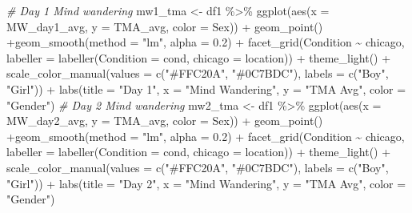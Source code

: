 \documentclass[
  letterpaper,
  DIV=11,
  numbers=noendperiod]{scrartcl}
\newenvironment{Shaded}{\begin{snugshade}}{\end{snugshade}}
\newcommand{\AttributeTok}[1]{\textcolor[rgb]{0.49,0.56,0.16}{#1}}
\newcommand{\CommentTok}[1]{\textcolor[rgb]{0.38,0.63,0.69}{\textit{#1}}}
\newcommand{\FloatTok}[1]{\textcolor[rgb]{0.25,0.63,0.44}{#1}}
\newcommand{\FunctionTok}[1]{\textcolor[rgb]{0.02,0.16,0.49}{#1}}
\newcommand{\NormalTok}[1]{\textcolor[rgb]{0.00,0.44,0.13}{#1}}
\newcommand{\OtherTok}[1]{\textcolor[rgb]{0.00,0.44,0.13}{#1}}
\newcommand{\SpecialCharTok}[1]{\textcolor[rgb]{0.25,0.44,0.63}{#1}}
\newcommand{\StringTok}[1]{\textcolor[rgb]{0.25,0.44,0.63}{#1}}
\begin{document}
\begin{Shaded}
\begin{Highlighting}[]
\CommentTok{\# Day 1 Mind wandering}
\NormalTok{mw1\_tma }\OtherTok{\textless{}{-}}\NormalTok{ df1 }\SpecialCharTok{\%\textgreater{}\%} 
  \FunctionTok{ggplot}\NormalTok{(}\FunctionTok{aes}\NormalTok{(}\AttributeTok{x =}\NormalTok{ MW\_day1\_avg, }\AttributeTok{y =}\NormalTok{ TMA\_avg, }\AttributeTok{color =}\NormalTok{ Sex)) }\SpecialCharTok{+}
  \FunctionTok{geom\_point}\NormalTok{() }\SpecialCharTok{+}\FunctionTok{geom\_smooth}\NormalTok{(}\AttributeTok{method =} \StringTok{"lm"}\NormalTok{, }\AttributeTok{alpha =} \FloatTok{0.2}\NormalTok{) }\SpecialCharTok{+}
  \FunctionTok{facet\_grid}\NormalTok{(Condition }\SpecialCharTok{\textasciitilde{}}\NormalTok{ chicago, }
             \AttributeTok{labeller =} \FunctionTok{labeller}\NormalTok{(}\AttributeTok{Condition =}\NormalTok{ cond,}
                                 \AttributeTok{chicago =}\NormalTok{ location)) }\SpecialCharTok{+}
  \FunctionTok{theme\_light}\NormalTok{() }\SpecialCharTok{+}
  \FunctionTok{scale\_color\_manual}\NormalTok{(}\AttributeTok{values =} \FunctionTok{c}\NormalTok{(}\StringTok{"\#FFC20A"}\NormalTok{, }\StringTok{"\#0C7BDC"}\NormalTok{), }\AttributeTok{labels =} \FunctionTok{c}\NormalTok{(}\StringTok{"Boy"}\NormalTok{, }\StringTok{"Girl"}\NormalTok{)) }\SpecialCharTok{+}
  \FunctionTok{labs}\NormalTok{(}\AttributeTok{title =} \StringTok{"Day 1"}\NormalTok{,}
       \AttributeTok{x =} \StringTok{"Mind Wandering"}\NormalTok{, }\AttributeTok{y =} \StringTok{"TMA Avg"}\NormalTok{, }\AttributeTok{color =} \StringTok{"Gender"}\NormalTok{)}
\CommentTok{\# Day 2 Mind wandering}
\NormalTok{mw2\_tma }\OtherTok{\textless{}{-}}\NormalTok{ df1 }\SpecialCharTok{\%\textgreater{}\%} 
  \FunctionTok{ggplot}\NormalTok{(}\FunctionTok{aes}\NormalTok{(}\AttributeTok{x =}\NormalTok{ MW\_day2\_avg, }\AttributeTok{y =}\NormalTok{ TMA\_avg, }\AttributeTok{color =}\NormalTok{ Sex)) }\SpecialCharTok{+}
  \FunctionTok{geom\_point}\NormalTok{() }\SpecialCharTok{+}\FunctionTok{geom\_smooth}\NormalTok{(}\AttributeTok{method =} \StringTok{"lm"}\NormalTok{, }\AttributeTok{alpha =} \FloatTok{0.2}\NormalTok{) }\SpecialCharTok{+}
  \FunctionTok{facet\_grid}\NormalTok{(Condition }\SpecialCharTok{\textasciitilde{}}\NormalTok{ chicago, }
             \AttributeTok{labeller =} \FunctionTok{labeller}\NormalTok{(}\AttributeTok{Condition =}\NormalTok{ cond,}
                                 \AttributeTok{chicago =}\NormalTok{ location)) }\SpecialCharTok{+}
  \FunctionTok{theme\_light}\NormalTok{() }\SpecialCharTok{+}
  \FunctionTok{scale\_color\_manual}\NormalTok{(}\AttributeTok{values =} \FunctionTok{c}\NormalTok{(}\StringTok{"\#FFC20A"}\NormalTok{, }\StringTok{"\#0C7BDC"}\NormalTok{), }\AttributeTok{labels =} \FunctionTok{c}\NormalTok{(}\StringTok{"Boy"}\NormalTok{, }\StringTok{"Girl"}\NormalTok{)) }\SpecialCharTok{+}
  \FunctionTok{labs}\NormalTok{(}\AttributeTok{title =} \StringTok{"Day 2"}\NormalTok{,}
       \AttributeTok{x =} \StringTok{"Mind Wandering"}\NormalTok{, }\AttributeTok{y =} \StringTok{"TMA Avg"}\NormalTok{, }\AttributeTok{color =} \StringTok{"Gender"}\NormalTok{)}
\end{Highlighting}
\end{Shaded}
\end{document}
